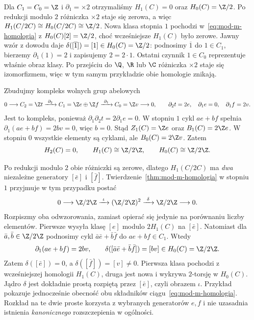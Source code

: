 \begin{przyklad}
Dla $C_1=C_0=\Z$ i $\partial_1=\times2$
otrzymaliśmy $H_1(C)=0$ oraz
$H_0(C)=\Z/2$. Po redukcji modulo
$2$ różniczka $\times2$ staje się
zerowa, a więc
$H_1(C/2C)\cong H_0(C/2C)\cong\Z/2$.
Nowa klasa stopnia $1$ pochodzi
w~\eqref{eq:mod-m-homologia} z
$H_0(C)[2]=\Z/2$, choć wcześniejsze
$H_1(C)$ było zerowe.
Jawny wzór z dowodu daje
$\delta([\overline1])=[1]\in H_0(C)=\Z/2$:
podnosimy $\overline1$ do $1\in C_1$,
bierzemy $\partial_1(1)=2$ i zapisujemy $2=2\cdot1$.
Ostatni czynnik $1\in C_0$ reprezentuje właśnie obraz klasy.
Po przejściu do $\Q$, $\R$ lub $\C$
różniczka $\times2$ staje się izomorfizmem,
więc w tym samym przykładzie obie homologie znikają.
\end{przyklad}

\begin{przyklad}
\label{prz:mod2-dwa-zrodla}
Zbudujmy kompleks wolnych grup abelowych
\[
 0\longrightarrow C_2=\Z t
 \xrightarrow{\ \partial_2\ }
 C_1=\Z e\oplus\Z f
 \xrightarrow{\ \partial_1\ }
 C_0=\Z v\longrightarrow0,
 \qquad
 \partial_2t=2e,\quad
 \partial_1e=0,\quad \partial_1f=2v.
\]
Jest to kompleks, ponieważ
$\partial_1\partial_2t=2\partial_1e=0$.
W stopniu $1$ cykl $ae+bf$ spełnia
$\partial_1(ae+bf)=2bv=0$, więc $b=0$.
Stąd $Z_1(C)=\Z e$ oraz $B_1(C)=2\Z e$.
W stopniu $0$ wszystkie elementy są cyklami,
ale $B_0(C)=2\Z v$. Zatem
\[
 H_2(C)=0,\qquad H_1(C)\cong\Z/2\Z,
 \qquad H_0(C)\cong\Z/2\Z.
\]

Po redukcji modulo $2$ obie różniczki są zerowe,
dlatego $H_1(C/2C)$ ma \emph{dwa} niezależne
generatory $[\bar e]$ i $[\bar f]$.
Twierdzenie~\ref{thm:mod-m-homologia} w stopniu $1$
przyjmuje w tym przypadku postać
\[
 0\longrightarrow\Z/2\Z
 \xrightarrow{\ \iota\ }(\Z/2\Z)^2
 \xrightarrow{\ \delta\ }\Z/2\Z
 \longrightarrow0.
\]
Rozpiszmy oba odwzorowania, zamiast
opierać się jedynie na porównaniu liczby elementów.
Pierwsze wysyła klasę $[e]$ modulo $2H_1(C)$
na $[\bar e]$. Natomiast dla
$\bar a,\bar b\in\Z/2\Z$
podnosimy cykl $\bar a\bar e+\bar b\bar f$
do $ae+bf\in C_1$. Wtedy
\[
 \partial_1(ae+bf)=2bv,\qquad
 \delta([\bar a\bar e+\bar b\bar f])
 =[bv]\in H_0(C)=\Z/2\Z.
\]
Zatem $\delta([\bar e])=0$, a
$\delta([\bar f])=[v]\ne0$.
Pierwsza klasa pochodzi z wcześniejszej homologii
$H_1(C)$, druga jest nowa i wykrywa $2$-torsję
w $H_0(C)$.
Jądro $\delta$ jest dokładnie prostą rozpiętą
przez $[\bar e]$, czyli obrazem $\iota$.
Przykład pokazuje jednocześnie obecność
obu składników ciągu~\eqref{eq:mod-m-homologia}.
Rozkład na te dwie proste korzysta z wybranych
generatorów $e,f$ i nie uzasadnia istnienia
\emph{kanonicznego} rozszczepienia w ogólności.
\end{przyklad}

